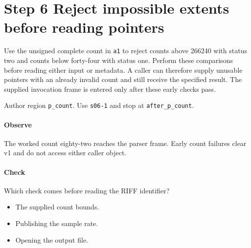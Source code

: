 \section{Step 6 Reject impossible extents before reading pointers}\label{pcm-wav-s06}
Use the unsigned complete count in \texttt{a1} to reject counts above 266240 with status two and counts below forty-four with status one. Perform these comparisons before reading either input or metadata. A caller can therefore supply unusable pointers with an already invalid count and still receive the specified result. The supplied invocation frame is entered only after these early checks pass.

Author region \texttt{p\_count}. Use \texttt{s06-1} and stop at \texttt{after\_p\_count}.

\paragraph{Observe} The worked count eighty-two reaches the parser frame. Early count failures clear v1 and do not access either caller object.

\paragraph{Check} Which check comes before reading the RIFF identifier?
\begin{itemize}
  \item[A.] The supplied count bounds.
  \item[B.] Publishing the sample rate.
  \item[C.] Opening the output file.
\end{itemize}
